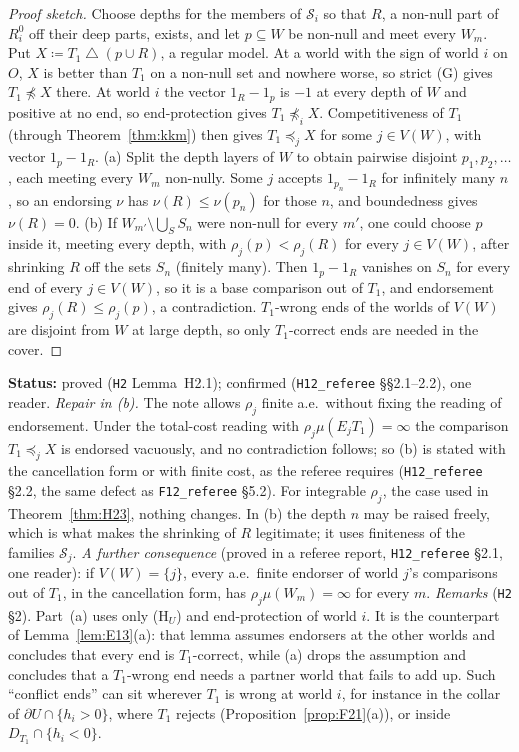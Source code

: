 \documentclass[11pt]{article}
\theoremstyle{definition}
\theoremstyle{remark}
\newcommand{\sd}{\mathbin{\triangle}}
\newcommand{\src}[1]{\texttt{#1}}
\newcommand{\status}[1]{\par\smallskip\noindent\textbf{Status:} #1\par\smallskip}
\begin{document}
\begin{proof}[Proof sketch]
Choose depths for the members of $\mathcal S_i$ so that $R$, a non-null part of $R^0_i$ off their deep parts, exists, and let $p\subseteq W$ be non-null and meet every $W_m$. Put $X\coloneqq T_1\sd(p\cup R)$, a regular model. At a world with the sign of world $i$ on $O$, $X$ is better than $T_1$ on a non-null set and nowhere worse, so strict (G) gives $T_1\not\preceq X$ there. At world $i$ the vector $1_R-1_p$ is $-1$ at every depth of $W$ and positive at no end, so end-protection gives $T_1\not\preceq_iX$. Competitiveness of $T_1$ (through Theorem~\ref{thm:kkm}) then gives $T_1\preceq_jX$ for some $j\in V(W)$, with vector $1_p-1_R$. (a) Split the depth layers of $W$ to obtain pairwise disjoint $p_1,p_2,\dots$, each meeting every $W_m$ non-nully. Some $j$ accepts $1_{p_n}-1_R$ for infinitely many $n$, so an endorsing $\nu$ has $\nu(R)\le\nu(p_n)$ for those $n$, and boundedness gives $\nu(R)=0$. (b) If $W_{m'}\setminus\bigcup_SS_n$ were non-null for every $m'$, one could choose $p$ inside it, meeting every depth, with $\rho_j(p)<\rho_j(R)$ for every $j\in V(W)$, after shrinking $R$ off the sets $S_n$ (finitely many). Then $1_p-1_R$ vanishes on $S_n$ for every end of every $j\in V(W)$, so it is a base comparison out of $T_1$, and endorsement gives $\rho_j(R)\le\rho_j(p)$, a contradiction. $T_1$-wrong ends of the worlds of $V(W)$ are disjoint from $W$ at large depth, so only $T_1$-correct ends are needed in the cover.
\end{proof}
\status{proved (\src{H2} Lemma~H2.1); confirmed (\src{H12\_referee} \S\S2.1--2.2), one reader. \emph{Repair in (b).} The note allows $\rho_j$ finite a.e.\ without fixing the reading of endorsement. Under the total-cost reading with $\rho_j\mu(E_jT_1)=\infty$ the comparison $T_1\preceq_jX$ is endorsed vacuously, and no contradiction follows; so (b) is stated with the cancellation form or with finite cost, as the referee requires (\src{H12\_referee} \S2.2, the same defect as \src{F12\_referee} \S5.2). For integrable $\rho_j$, the case used in Theorem~\ref{thm:H23}, nothing changes. In (b) the depth $n$ may be raised freely, which is what makes the shrinking of $R$ legitimate; it uses finiteness of the families $\mathcal S_j$. \emph{A further consequence} (proved in a referee report, \src{H12\_referee} \S2.1, one reader): if $V(W)=\{j\}$, every a.e.\ finite endorser of world $j$'s comparisons out of $T_1$, in the cancellation form, has $\rho_j\mu(W_m)=\infty$ for every $m$. \emph{Remarks} (\src{H2} \S2). Part~(a) uses only (H$_U$) and end-protection of world $i$. It is the counterpart of Lemma~\ref{lem:E13}(a): that lemma assumes endorsers at the other worlds and concludes that every end is $T_1$-correct, while (a) drops the assumption and concludes that a $T_1$-wrong end needs a partner world that fails to add up. Such ``conflict ends'' can sit wherever $T_1$ is wrong at world $i$, for instance in the collar of $\partial U\cap\{h_i>0\}$, where $T_1$ rejects (Proposition~\ref{prop:F21}(a)), or inside $D_{T_1}\cap\{h_i<0\}$.}
\end{document}
